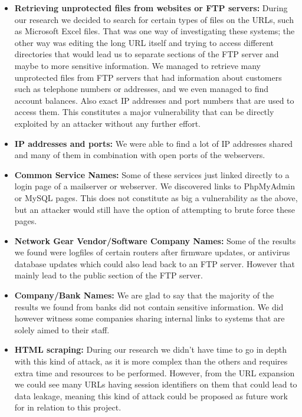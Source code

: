 \documentclass[12pt]{article}
\begin{document}
\begin{itemize}
\item \textbf{Retrieving unprotected files from websites or FTP servers:} During our research we decided to search for certain types of files on the URLs, such as Microsoft Excel files. That was one way of investigating these systems; the other way was editing the long URL itself and trying to access different directories that would lead us to separate sections of the FTP server and maybe to more sensitive information. We managed to retrieve many unprotected files from FTP servers that had information about customers such as telephone numbers or addresses, and we even managed to find account balances. Also exact IP addresses and port numbers that are used to access them. This constitutes a major vulnerability that can be directly exploited by an attacker without any further effort.

\item \textbf{IP addresses and ports:}  We were able to find a lot of IP addresses shared and many of them in combination with open ports of the webservers.

\item \textbf{Common Service Names:} Some of these services just linked directly to a login page of a mailserver or webserver. We discovered links to PhpMyAdmin or MySQL pages. This does not constitute as big a vulnerability as the above, but an attacker would still have the option of attempting to brute force these pages.

\item \textbf{Network Gear Vendor/Software Company Names:} Some of the results we found were logfiles of certain routers after firmware updates, or antivirus database updates which could also lead back to an FTP server. However that mainly lead to the public section of the FTP server.

\item \textbf{Company/Bank Names:} We are glad to say that the majority of the results we found from banks did not contain sensitive information. We did however witness some companies sharing internal links to systems that are solely aimed to their staff.

\item \textbf{HTML scraping:} During our research we didn't have time to go in depth with this kind of attack, as it is more complex than the others and requires extra time and resources to be performed. However, from the URL expansion we could see many URLs having session identifiers on them that could lead to data leakage, meaning this kind of attack could be proposed as future work for in relation to this project.

\end{itemize}
\end{document}
